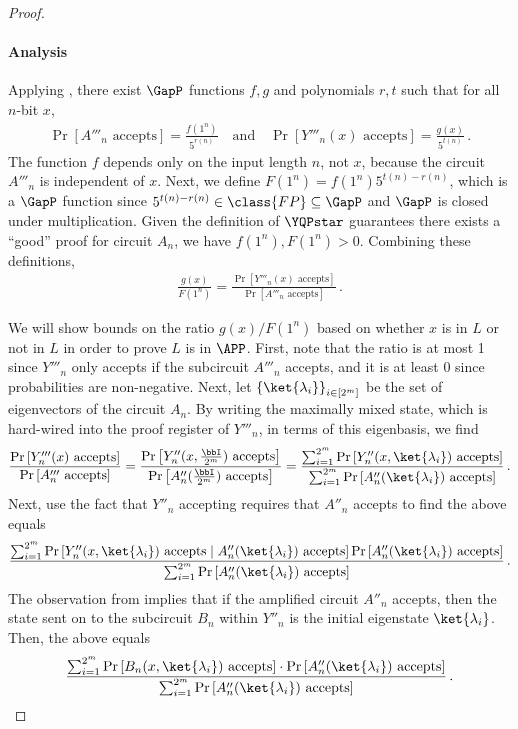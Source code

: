 \documentclass{toc}
\begin{document}
\begin{proof}
	\paragraph{Analysis}
	Applying , there exist $\GapP$ functions $f,g$ and polynomials
	$r,t$ such that for all $n$-bit $x$,
	\begin{gather*}
		\Pr\left[A'''_n\text{ accepts}\right] = \frac{f(1^n)}{5^{r(n)}}
		\quad\text{and}\quad
		\Pr\left[Y'''_n(x)\text{ accepts}\right] = \frac{g(x)}{5^{t(n)}} \, .
	\end{gather*}
	The function $f$ depends only on the input length $n$, not $x$,
	because the circuit $A'''_n$ is independent of $x$.
	Next, we define $F(1^n) = f(1^n) 5^{t(n)-r(n)}$, which is a $\GapP$ function
	since $5^{t(n)-r(n)}\in \class{FP}\subseteq \GapP$ and $\GapP$ is closed under
	multiplication.
	Given the definition of $\YQPstar$ guarantees there
	exists a ``good'' proof for circuit $A_n$,
	we have  $f(1^n),F(1^n)>0$.
	Combining these definitions,
	\begin{gather*}
		\frac{g(x)}{F(1^n)} =
		\frac{\Pr\left[Y'''_n(x)\text{ accepts}\right]}
		{\Pr\left[A'''_n\text{ accepts}\right] } \, .
	\end{gather*}
	
	We will show bounds on the ratio $g(x)/F(1^n)$ based on whether $x$ is in $L$ or
	not in $L$ in order to prove $L$ is in $\APP$.
	First, note that the ratio is
 at most %
 1 since $Y'''_n$ only accepts if the subcircuit $A'''_n$ accepts,
 and it is %
 at least %
0 since probabilities are non-negative.
	Next, let $\left\{\ket{\lambda_i}\right\}_{i\in[2^m]}$ be the set of
	eigenvectors of the circuit $A_n$.
	By writing the maximally mixed state, which is hard-wired into the proof register of
	$Y'''_n$,
	in terms of this eigenbasis, we find
	\[
		\frac{\Pr\left[Y'''_n(x)\text{ accepts}\right]}
		{\Pr\left[A'''_n\text{ accepts}\right]}
		= \frac{\Pr\left[Y''_n(x,\frac{\bbI}{2^m})\text{ accepts}\right]}
		{\Pr\left[A''_n(\frac{\bbI}{2^m})\text{ accepts}\right]}
		= \frac{\sum_{i=1}^{2^{m}}
			\Pr\left[Y''_n(x,\ket{\lambda_i})\text{ accepts}\right]}
		{\sum_{i=1}^{2^{m}} \Pr\left[A''_n(\ket{\lambda_i})
			\text{ accepts}\right]} \, .
	\]
	Next, use the fact that $Y''_n$ accepting requires that
	$A''_n$ accepts to find the above equals
	\[
		\frac{\sum_{i=1}^{2^{m}}
		\Pr\left[Y''_n(x,\ket{\lambda_i})\text{ accepts}
		\mid A''_n(\ket{\lambda_i})\text{ accepts} \right]
		\Pr\left[A''_n(\ket{\lambda_i})\text{ accepts}\right]}
		{\sum_{i=1}^{2^{m}} \Pr\left[A''_n(\ket{\lambda_i})
		\text{ accepts}\right]}  \, .
	\]
	The observation from 
	implies	that if the amplified circuit $A''_n$ %
	accepts, then %
	the state sent on to the subcircuit $B_n$ within $Y''_n$ is 
the initial eigenstate $\ket{\lambda_i}$.
	Then, the above equals
	\[
		\frac{\sum_{i=1}^{2^{m}}
			\Pr\left[B_n(x,\ket{\lambda_i})\text{ accepts}\right]
			\cdot \Pr\left[A''_n(\ket{\lambda_i})\text{ accepts}\right]}
		{\sum_{i=1}^{2^{m}} \Pr\left[A''_n(\ket{\lambda_i})
			\text{ accepts}\right]} \, .
	\]


\end{proof}
\end{document}
